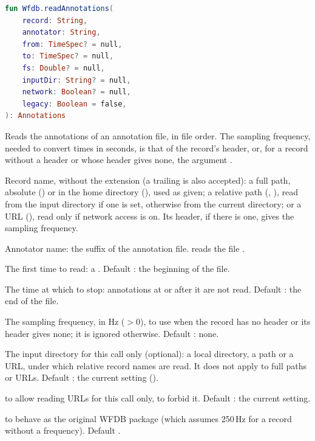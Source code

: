 \begin{lstlisting}[language=Kotlin,style=signature]
fun Wfdb.readAnnotations(
    record: String,
    annotator: String,
    from: TimeSpec? = null,
    to: TimeSpec? = null,
    fs: Double? = null,
    inputDir: String? = null,
    network: Boolean? = null,
    legacy: Boolean = false,
): Annotations
\end{lstlisting}
Reads the annotations of an annotation file, in file order. The sampling frequency,
needed to convert times in seconds, is that of the record's header, or, for a record
without a header or whose header gives none, the argument .
\begin{params}
\item[record] Record name, without the  extension (a trailing  is
  also accepted): a full path, absolute () or in the home
  directory (), used as given; a relative path
  (, ), read from the input directory if one is set,
  otherwise from the current directory; or a URL
  (), read only if network access is
  on. Its header, if there is one, gives the sampling frequency.
\item[annotator] Annotator name: the suffix of the annotation file.  reads the
  file .
\item[from] The first time to read: a . Default : the beginning
  of the file.
\item[to] The time at which to stop: annotations at or after it are not read. Default
  : the end of the file.
\item[fs] The sampling frequency, in Hz ($> 0$), to use when the record has no header or
  its header gives none; it is ignored otherwise. Default : none.
\item[inputDir] The input directory for this call only (optional): a local directory, a
  \code{\textasciitilde} path or a URL, under which relative record names are read. It
  does not apply to full paths or URLs. Default : the current setting
  ().
\item[network]  to allow reading URLs for this call only,  to
  forbid it. Default : the current setting.
\item[legacy]  to behave as the original WFDB package (which assumes 250\,Hz
  for a record without a frequency). Default .
\end{params}
